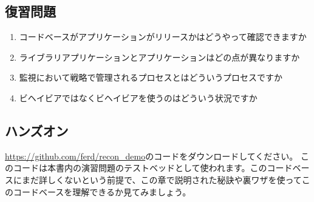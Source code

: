 \subsection*{復習問題}

\begin{enumerate}
  \item コードベースがアプリケーションがリリースかはどうやって確認できますか
  \item ライブラリアプリケーションとアプリケーションはどの点が異なりますか
  \item 監視において戦略で管理されるプロセスとはどういうプロセスですか
  \item {}ビヘイビアではなくビヘイビアを使うのはどういう状況ですか
\end{enumerate}

\subsection*{ハンズオン}

\href{https://github.com/ferd/recon\_demo}{https://github.com/ferd/recon\_demo}のコードをダウンロードしてください。
このコードは本書内の演習問題のテストベッドとして使われます。このコードベースにまだ詳しくないという前提で、この章で説明された秘訣や裏ワザを使ってこのコードベースを理解できるか見てみましょう。

